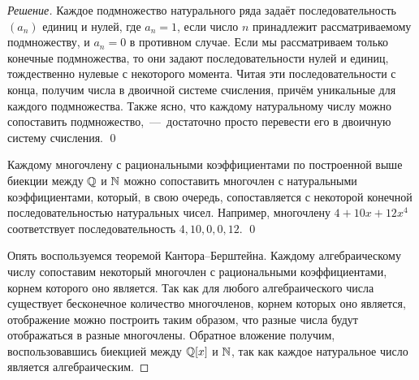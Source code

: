 \begin{proof}[Решение]
        Каждое подмножество натурального ряда задаёт последовательность \((a_n)\) единиц и нулей, где \(a_n = 1\), если число \(n\) принадлежит рассматриваемому подмножеству, и \(a_n = 0\) в противном случае. Если мы рассматриваем только конечные подмножества, то они задают последовательности нулей и единиц, тождественно нулевые с некоторого момента. Читая эти последовательности с конца, получим числа в двоичной системе счисления, причём уникальные для каждого подмножества. Также ясно, что каждому натуральному числу можно сопоставить подмножество,~---~достаточно просто перевести его в двоичную систему счисления. \qed

        Каждому многочлену с рациональными коэффициентами по построенной выше биекции между \(\mathbb{Q}\) и \(\mathbb{N}\) можно сопоставить многочлен с натуральными коэффициентами, который, в свою очередь, сопоставляется с некоторой конечной последовательностью натуральных чисел. Например, многочлену \(4 + 10x + 12x^4\) соответствует последовательность \(4, 10, 0, 0, 12\). \qed

        Опять воспользуемся теоремой Кантора--Берштейна. Каждому алгебраическому числу сопоставим некоторый многочлен с рациональными коэффициентами, корнем которого оно является. Так как для любого алгебраического числа существует бесконечное количество многочленов, корнем которых оно является, отображение можно построить таким образом, что разные числа будут отображаться в разные многочлены. Обратное вложение получим, воспользовавшись биекцией между \(\mathbb{Q}[x]\) и \(\mathbb{N}\), так как каждое натуральное число является алгебраическим.
    \end{proof}

